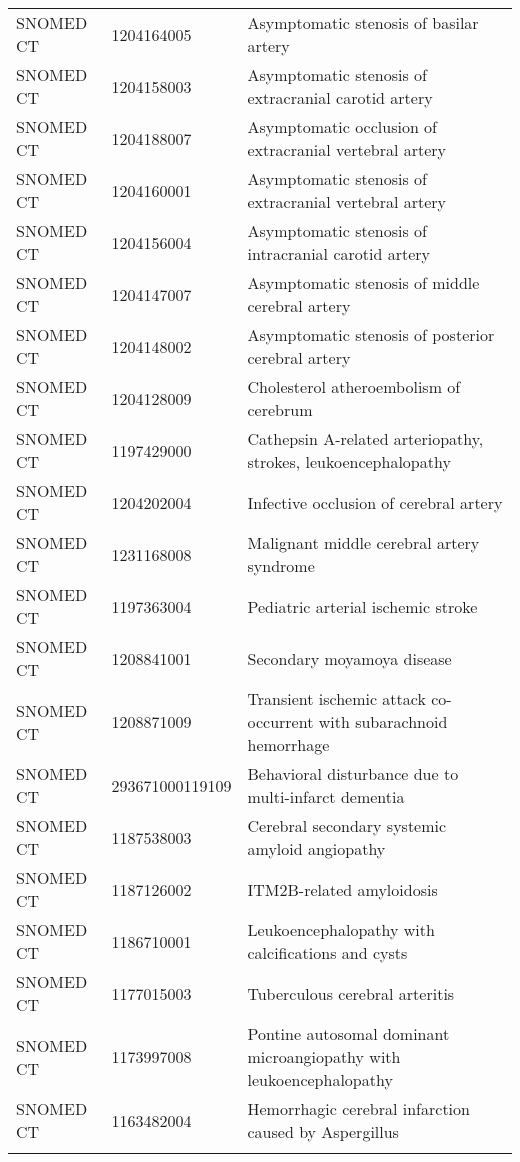 \begin{longtable}{p{}p{}p{}}
  SNOMED CT & 1204164005 & Asymptomatic stenosis of basilar artery \\ 
  SNOMED CT & 1204158003 & Asymptomatic stenosis of extracranial carotid artery \\ 
  SNOMED CT & 1204188007 & Asymptomatic occlusion of extracranial vertebral artery \\ 
  SNOMED CT & 1204160001 & Asymptomatic stenosis of extracranial vertebral artery \\ 
  SNOMED CT & 1204156004 & Asymptomatic stenosis of intracranial carotid artery \\ 
  SNOMED CT & 1204147007 & Asymptomatic stenosis of middle cerebral artery \\ 
  SNOMED CT & 1204148002 & Asymptomatic stenosis of posterior cerebral artery \\ 
  SNOMED CT & 1204128009 & Cholesterol atheroembolism of cerebrum \\ 
  SNOMED CT & 1197429000 & Cathepsin A-related arteriopathy, strokes, leukoencephalopathy \\ 
  SNOMED CT & 1204202004 & Infective occlusion of cerebral artery \\ 
  SNOMED CT & 1231168008 & Malignant middle cerebral artery syndrome \\ 
  SNOMED CT & 1197363004 & Pediatric arterial ischemic stroke \\ 
  SNOMED CT & 1208841001 & Secondary moyamoya disease \\ 
  SNOMED CT & 1208871009 & Transient ischemic attack co-occurrent with subarachnoid hemorrhage \\ 
  SNOMED CT & 293671000119109 & Behavioral disturbance due to multi-infarct dementia \\ 
  SNOMED CT & 1187538003 & Cerebral secondary systemic amyloid angiopathy \\ 
  SNOMED CT & 1187126002 & ITM2B-related amyloidosis \\ 
  SNOMED CT & 1186710001 & Leukoencephalopathy with calcifications and cysts \\ 
  SNOMED CT & 1177015003 & Tuberculous cerebral arteritis \\ 
  SNOMED CT & 1173997008 & Pontine autosomal dominant microangiopathy with leukoencephalopathy \\ 
  SNOMED CT & 1163482004 & Hemorrhagic cerebral infarction caused by Aspergillus \\ 
  \hline
\label{tab:codes_cerbro}
\end{longtable}
